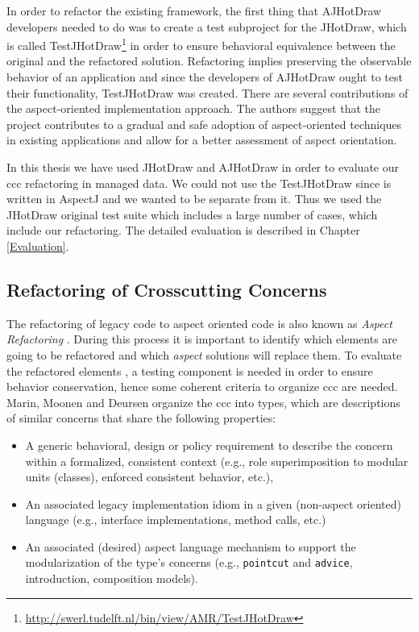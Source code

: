 In order to refactor the existing framework, the first thing that AJHotDraw developers needed to do was to create a test subproject for the JHotDraw, which is called TestJHotDraw\footnote{\url{http://swerl.tudelft.nl/bin/view/AMR/TestJHotDraw}} in order to ensure behavioral equivalence between the original and the refactored solution. 
Refactoring implies preserving the observable behavior of an application\cite{fowler2009refactoring} and since the developers of AJHotDraw ought to test their functionality, TestJHotDraw was created. 
There are several contributions of the aspect-oriented implementation approach\cite{marinajhotdraw}. 
The authors suggest that the project contributes to a gradual and safe adoption of aspect-oriented techniques in existing applications and allow for a better assessment of aspect orientation.

In this thesis we have used JHotDraw and AJHotDraw in order to evaluate our \ac{ccc} refactoring in managed data.
We could not use the TestJHotDraw since is written in AspectJ and we wanted to be separate from it. 
Thus we used the JHotDraw original test suite which includes a large number of cases, which include our refactoring.
The detailed evaluation is described in Chapter \ref{Evaluation}.

\subsection{Refactoring of Crosscutting Concerns}\label{Refactoring of ccc}
The refactoring of legacy code to aspect oriented code is also known as \textit{Aspect Refactoring} \cite{marin2005approach}. 
During this process it is important to identify which elements are going to be refactored and which \textit{aspect} solutions will replace them. 
To evaluate the refactored elements \cite{fowler2009refactoring}, a testing component is needed in order to ensure behavior conservation, hence some coherent criteria to organize \ac{ccc} are needed. 
Marin, Moonen and Deursen \cite{marin2005approach} organize the \ac{ccc} into types, which are descriptions of similar concerns that share the following properties: 

\begin{itemize}
	\item A generic behavioral, design or policy requirement to describe the concern within a formalized, consistent context (e.g., role superimposition to modular units (classes), enforced consistent behavior, etc.),

	\item An associated legacy implementation idiom in a given (non-aspect oriented) language (e.g., interface implementations, method calls, etc.)

	\item An associated (desired) aspect language mechanism to support the modularization of the type's concerns (e.g., \texttt{pointcut} and \texttt{advice}, introduction, composition models).
\end{itemize}


